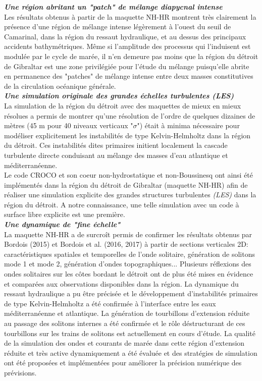 \documentclass[a4paper,11pt]{report}
\begin{document}
\noindent \textit{\textbf{Une région abritant un "patch" de mélange diapycnal intense}}\\
 Les résultats obtenus à partir de la maquette NH-HR montrent très clairement la présence d'une région de mélange intense légèrement à l'ouest du seuil de Camarinal, dans la région du ressaut hydraulique, et au dessus des principaux accidents bathymétriques. Même si l'amplitude des processus qui l'induisent est modulée par le cycle de marée, il n'en demeure pas moins que la région du détroit de Gibraltar est une zone privilégiée pour l'étude du mélange puisqu'elle abrite en permanence des "patches" de mélange intense entre deux masses constitutives de la circulation océanique générale. \\
 
\noindent\textit{\textbf{Une simulation originale des grandes échelles turbulentes (LES)}}\\
La simulation de la région du détroit avec des maquettes de mieux en mieux résolues a permis de montrer qu'une résolution de l'ordre de quelques dizaines de mètres (45 m pour 40 niveaux verticaux "$\sigma$") était à minima nécessaire pour modéliser explicitement les instabilités de type Kelvin-Helmholtz dans la région du détroit. Ces instabilités dites primaires initient localement la cascade turbulente directe conduisant au mélange des masses d'eau atlantique et méditerranéenne.\\
Le code CROCO et son coeur non-hydrostatique et non-Boussinesq ont ainsi été implémentés dans la région du détroit de Gibraltar (maquette NH-HR) afin de réaliser une simulation explicite des grandes structures turbulentes \textit{(LES)} dans la région du détroit. A notre connaissance, une telle simulation avec un code à surface libre explicite est une première.\\

\noindent\textit{\textbf{Une dynamique de "fine échelle"}}\\
La maquette NH-HR a de surcroît permis de confirmer les résultats obtenus par Bordois (2015) et Bordois et al. (2016, 2017) à partir de sections verticales 2D: caractéristiques spatiales et temporelles de l'onde solitaire, génération de solitons mode 1 et mode 2, génération d'ondes topographiques... Plusieurs réflexions des ondes solitaires sur les côtes bordant le détroit ont de plus été mises en évidence et comparées aux observations disponibles dans la région. La dynamique du ressaut hydraulique a pu être précisée et le développement d'instabilités primaires de type Kelvin-Helmholtz a été confirmée à l'interface entre les eaux méditerranéenne et atlantique. La génération de tourbillons d'extension réduite au passage des solitons internes a été confirmée et le rôle déstructurant de ces tourbillons sur les trains de solitons est actuellement en cours d'étude.
La qualité de la simulation des ondes et courants de marée dans cette région d'extension réduite et très active dynamiquement a été évaluée et des stratégies de simulation ont été proposées et implémentées pour améliorer la précision numérique des prévisions.\\
\end{document}
